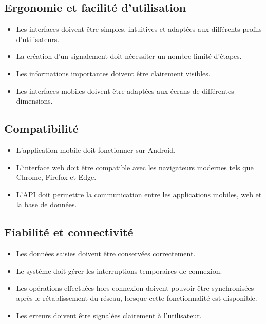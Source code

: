 \documentclass[11pt,a4paper,oneside]{report}
\begin{document}
	\subsection{Ergonomie et facilité d'utilisation}
	
	\begin{itemize}
		\item Les interfaces doivent être simples, intuitives et adaptées
		aux différents profils d'utilisateurs.
		\item La création d'un signalement doit nécessiter un nombre
		limité d'étapes.
		\item Les informations importantes doivent être clairement visibles.
		\item Les interfaces mobiles doivent être adaptées aux écrans
		de différentes dimensions.
	\end{itemize}
	
	\subsection{Compatibilité}
	
	\begin{itemize}
		\item L'application mobile doit fonctionner sur Android.
		\item L'interface web doit être compatible avec les navigateurs
		modernes tels que Chrome, Firefox et Edge.
		\item L'API doit permettre la communication entre les applications
		mobiles, web et la base de données.
	\end{itemize}
	
	\subsection{Fiabilité et connectivité}
	
	\begin{itemize}
		\item Les données saisies doivent être conservées correctement.
		\item Le système doit gérer les interruptions temporaires
		de connexion.
		\item Les opérations effectuées hors connexion doivent pouvoir
		être synchronisées après le rétablissement du réseau, lorsque
		cette fonctionnalité est disponible.
		\item Les erreurs doivent être signalées clairement à l'utilisateur.
	\end{itemize}
	
\end{document}
